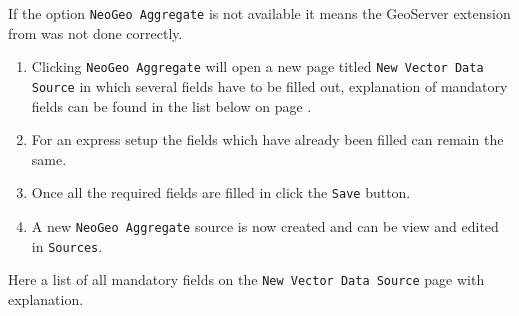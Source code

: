 \noindent If the option \lstinline|NeoGeo Aggregate| is not available it means the GeoServer extension from  was not done correctly.

\begin{enumerate}[resume]
	\item Clicking \lstinline|NeoGeo Aggregate| will open a new page titled \lstinline|New Vector Data Source| in which several fields have to be filled out, explanation of mandatory fields can be found in the list below on page \pageref{list:manditory}.
	\item For an express setup the fields which have already been filled can remain the same.
	\item Once all the required fields are filled in click the \lstinline|Save| button.
	\item A new \lstinline|NeoGeo Aggregate| source is now created and can be view and edited in \lstinline|Sources|.
\end{enumerate}

\noindent Here a list of all mandatory fields on the \lstinline|New Vector Data Source| page with explanation.

